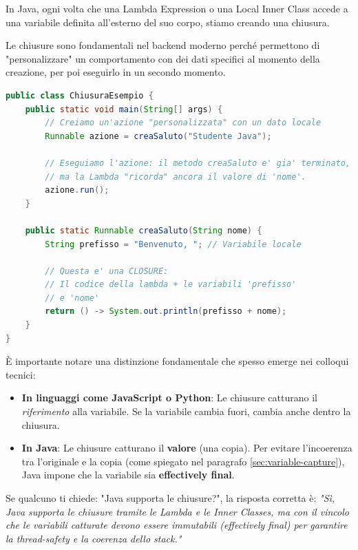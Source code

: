 In Java, ogni volta che una Lambda Expression o una Local Inner Class accede a una variabile definita all'esterno del suo corpo, stiamo creando una chiusura.

Le chiusure sono fondamentali nel backend moderno perché permettono di "personalizzare" un comportamento con dei dati specifici al momento della creazione, per poi eseguirlo in un secondo momento.

\begin{lstlisting}[language=Java, caption={Esempio pratico di Closure}]
public class ChiusuraEsempio {
    public static void main(String[] args) {
        // Creiamo un'azione "personalizzata" con un dato locale
        Runnable azione = creaSaluto("Studente Java");
        
        // Eseguiamo l'azione: il metodo creaSaluto e' gia' terminato,
        // ma la Lambda "ricorda" ancora il valore di 'nome'.
        azione.run(); 
    }

    public static Runnable creaSaluto(String nome) {
        String prefisso = "Benvenuto, "; // Variabile locale
        
        // Questa e' una CLOSURE:
        // Il codice della lambda + le variabili 'prefisso'
        // e 'nome'
        return () -> System.out.println(prefisso + nome);
    }
}
\end{lstlisting}

È importante notare una distinzione fondamentale che spesso emerge nei colloqui tecnici:
\begin{itemize}
    \item \textbf{In linguaggi come JavaScript o Python}: Le chiusure catturano il \textit{riferimento} alla variabile. Se la variabile cambia fuori, cambia anche dentro la chiusura.
    \item \textbf{In Java}: Le chiusure catturano il \textbf{valore} (una copia). Per evitare l'incoerenza tra l'originale e la copia (come spiegato nel paragrafo \ref{sec:variable-capture}), Java impone che la variabile sia \textbf{effectively final}.
\end{itemize}

\begin{warningbox}[]
Se qualcuno ti chiede: "Java supporta le chiusure?", la risposta corretta è: \textit{"Sì, Java supporta le chiusure tramite le Lambda e le Inner Classes, ma con il vincolo che le variabili catturate devono essere immutabili (effectively final) per garantire la thread-safety e la coerenza dello stack."}
\end{warningbox}


